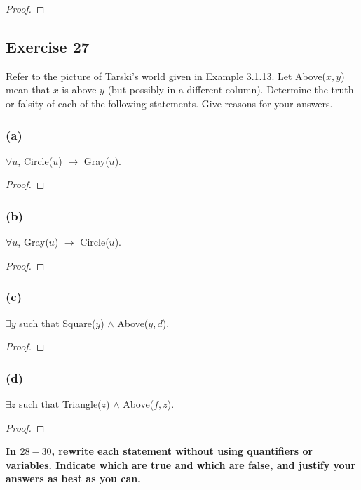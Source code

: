 \documentclass[14pt]{extarticle}
\newcommand{\fa}{\forall}
\newcommand{\te}{\exists}
\begin{document}
\begin{proof}

\end{proof}

\subsection{Exercise 27}
Refer to the picture of Tarski’s world given in Example 3.1.13. Let Above($x, y$) mean that $x$ is above $y$ (but possibly in a different column). Determine the truth or falsity of each of the following statements. Give reasons for your answers.

\subsubsection{(a)}
$\fa u$, Circle($u$) $\to$ Gray($u$).

\begin{proof}

\end{proof}

\subsubsection{(b)}
$\fa u$, Gray($u$) $\to$ Circle($u$).

\begin{proof}

\end{proof}

\subsubsection{(c)}
$\te y$ such that Square($y$) $\wedge$ Above($y, d$).

\begin{proof}

\end{proof}

\subsubsection{(d)}
$\te z$ such that Triangle($z$) $\wedge$ Above($f, z$).
\begin{proof}

\end{proof}

{\bf \color{cyan} In $28-30$, rewrite each statement without using quantifiers or variables. Indicate which are true and which are false, and justify your answers as best as you can.}
\end{document}
